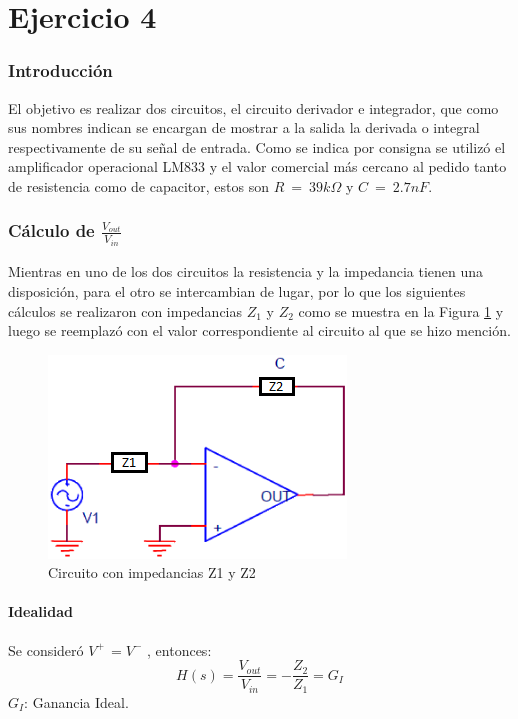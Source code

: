 \part{Ejercicio 4}
\section{Introducción}
	El objetivo es realizar dos circuitos, el circuito derivador e integrador, que como sus nombres indican se encargan de mostrar a la salida la derivada  o integral respectivamente de su señal de entrada.
	Como se indica por consigna se utilizó el amplificador operacional LM833 y el valor comercial más cercano al pedido tanto de resistencia como de capacitor, estos son $R \ = \ 39k \Omega$ y $C \ = \ 2.7 nF$.

\section{Cálculo de $\frac{V_{out}}{V_{in}}$}
Mientras en uno de los dos circuitos la resistencia y la impedancia tienen una disposición, para el otro se intercambian de lugar, por lo que los siguientes cálculos se realizaron con impedancias $Z_1$ y $Z_2 $ como se muestra en la Figura \ref{fig:circconz1z2} y luego se reemplazó con el valor correspondiente al circuito al que se hizo mención.
\begin{figure}[H]
\centering
\includegraphics[scale=0.5]{../Ex4/circconz1z2.png}
\caption{Circuito con impedancias Z1 y Z2}
\label{fig:circconz1z2}
\end{figure}

\subsection{Idealidad}
Se consideró $V^+\,=V^-$ , entonces:
\begin{equation}
	H(s) = \dfrac{V_{out}}{V_{in}} = - \dfrac{Z_2}{Z_1} = G_I
	\label{eq:gananciaideal}
\end{equation}
$G_I$: Ganancia Ideal.

